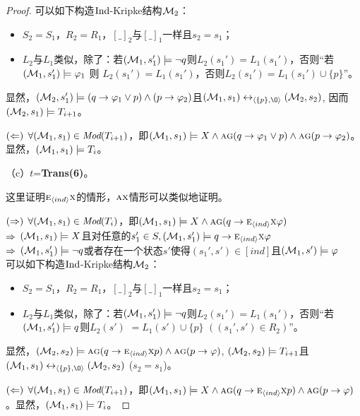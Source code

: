 \begin{proof}
   可以如下构造$\textrm{Ind}$-Kripke结构${\cal M}_2$：
   \begin{itemize}
   	\item $S_2=S_1$，$R_2=R_1$，$[\_]_2$与$[\_]_1$一样且$s_2=s_1$；
   	\item $L_2$与$L_1$类似，除了：若$({\cal M}_1, s_1') \models \neg q$则$L_2(s_1') = L_1(s_1')$，否则“若$({\cal M}_1,s_1') \models \varphi_1$ 则 $L_2(s_1')=L_1(s_1')$，否则$L_2(s_1')=L_1(s_1') \cup \{p\}$”。
   \end{itemize}
   显然，$({\cal M}_2,s_1') \models (q\rightarrow \varphi_1 \vee p) \wedge (p \rightarrow \varphi_2)$且$(\Hm_1, s_1) \lrto_{\tuple{\{p\}, {\O}}} (\Hm_2, s_2)$, 因而$({\cal M}_2,s_1) \models T_{i+1}$。
	
	$(\Leftarrow)$  $\forall ({\cal M}_1, s_1) \in \textit{Mod}(T_{i+1})$，即$({\cal M}_1,s_1) \models X \wedge \textsc{a}\textsc{g} (q\rightarrow \varphi_1 \vee p) \wedge \textsc{a}\textsc{g}(p \rightarrow \varphi_2)$。 显然，$({\cal M}_1, s_1) \models T_i$。
	
	（c）$t$=\textbf{Trans(6)}。
	
	这里证明$\textsc{e}_{{\langle{ind}\rangle}} \textsc{x}$的情形，$\textsc{a} \textsc{x}$情形可以类似地证明。
	
	$(\Rightarrow)$ $\forall({\cal M}_1,s_1) \in \textit{Mod}(T_i)$，即$({\cal M}_1,s_1) \models X \wedge \textsc{a}\textsc{g}(q \rightarrow \textsc{e}_{{\langle{ind}\rangle}}\textsc{x} \varphi)$\\
	$\Rightarrow$ $({\cal M}_1,s_1) \models X$且对任意的$s_1'\in S, ({\cal M}_1,s_1') \models q \rightarrow \textsc{e}_{{\langle{ind}\rangle}} \textsc{x} \varphi$\\
	$\Rightarrow$ $({\cal M}_1,s_1') \models \neg q$或者存在一个状态$s'$使得$(s_1', s') \in [ind]$且$({\cal M}_1,s') \models \varphi$\\
	
	可以如下构造$\textrm{Ind}$-Kripke结构${\cal M}_2$：
	\begin{itemize}
		\item $S_2=S_1$，$R_2=R_1$，$[\_]_2$与$[\_]_1$一样且$s_2=s_1$；
		\item $L_2$与$L_1$类似，除了：若$({\cal M}_1, s_1') \models \neg q$则$L_2(s_1') = L_1(s_1')$，否则“若$({\cal M}_1,s_1') \models q$则$L_2(s')$ $=L_1(s')\cup \{p\}$ $((s_1',s')\in R_2)$”。
	\end{itemize}
	显然，$({\cal M}_2,s_2) \models \textsc{a}\textsc{g}(q\rightarrow \textsc{e}_{{\langle{ind}\rangle}} \textsc{x} p) \wedge \textsc{a}\textsc{g}(p \rightarrow \varphi)$, $({\cal M}_2,s_2) \models T_{i+1}$且$(\Hm_1, s_1) \lrto_{\tuple{\{p\}, {\O}}} (\Hm_2, s_2)$ ($s_2=s_1$)。
	
	$(\Leftarrow)$ $\forall({\cal M}_1, s_1) \in \textit{Mod}(T_{i+1})$，即$({\cal M}_1,s_1) \models X \wedge \textsc{a}\textsc{g}(q\rightarrow \textsc{e}_{{\langle{ind}\rangle}} \textsc{x} p) \wedge \textsc{a}\textsc{g}(p \rightarrow \varphi)$。显然，$({\cal M}_1, s_1) \models T_i$。
\end{proof}

